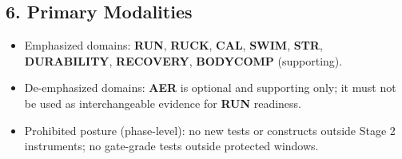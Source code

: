 \documentclass[10pt]{article}
\begin{document}
\subsection*{6. Primary Modalities}

\begin{itemize}
\item Emphasized domains: \textbf{RUN}, \textbf{RUCK}, \textbf{CAL}, \textbf{SWIM}, \textbf{STR}, \textbf{DURABILITY}, \textbf{RECOVERY}, \textbf{BODYCOMP} (supporting).
\item De-emphasized domains: \textbf{AER} is optional and supporting only; it must not be used as interchangeable evidence for \textbf{RUN} readiness.
\item Prohibited posture (phase-level): no new tests or constructs outside Stage 2 instruments; no gate-grade tests outside protected windows.
\end{itemize}
\end{document}
